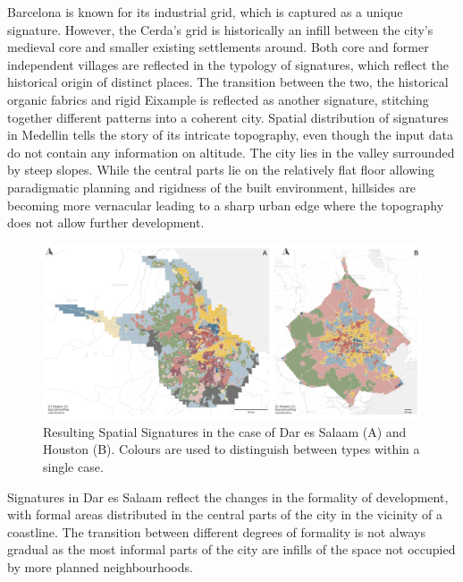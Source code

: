 Barcelona is known for its industrial grid, which is captured as a unique signature.
However, the Cerda’s grid is historically an infill between the city's medieval core and
smaller existing settlements around. Both core and former independent villages are
reflected in the typology of signatures, which reflect the historical origin of distinct
places. The transition between the two, the historical organic fabrics and rigid
Eixample is reflected as another signature, stitching together different patterns into a
coherent city.
Spatial distribution of signatures in Medellin tells the story of its intricate
topography, even though the input data do not contain any information on altitude. The
city lies in the valley surrounded by steep slopes. While the central parts lie on the
relatively flat floor allowing paradigmatic planning and rigidness of the built
environment, hillsides are becoming more vernacular leading to a sharp urban edge where
the topography does not allow further development.

\begin{figure}
    \includegraphics[width=\linewidth]{figures/maps2.png}
    \caption{Resulting Spatial Signatures in the case of Dar es Salaam (A) and Houston (B).
    Colours are used to distinguish between types within a single case.}
    \label{fig:maps2}
\end{figure}

Signatures in Dar es Salaam reflect the changes in the formality of development, with
formal areas distributed in the central parts of the city in the vicinity of a
coastline. The transition between different degrees of formality is not always gradual
as the most informal parts of the city are infills of the space not occupied by more
planned neighbourhoods.


